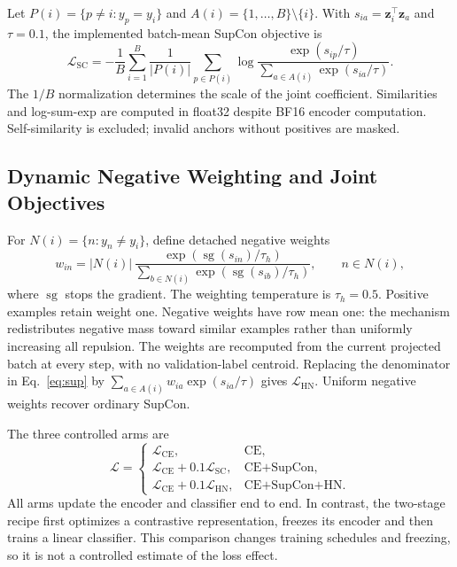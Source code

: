\documentclass[runningheads]{llncs}
\begin{document}
Let $P(i)=\{p\ne i:y_p=y_i\}$ and $A(i)=\{1,\ldots,B\}\setminus\{i\}$. With $s_{ia}=\mathbf z_i^\top\mathbf z_a$ and $\tau=0.1$, the implemented batch-mean SupCon objective is
\begin{equation}
\mathcal L_{\mathrm{SC}}=-\frac1B\sum_{i=1}^B\frac1{|P(i)|}
\sum_{p\in P(i)}\log\frac{\exp(s_{ip}/\tau)}{\sum_{a\in A(i)}\exp(s_{ia}/\tau)}.
\label{eq:sup}
\end{equation}
The $1/B$ normalization determines the scale of the joint coefficient. Similarities and log-sum-exp are computed in float32 despite BF16 encoder computation. Self-similarity is excluded; invalid anchors without positives are masked.

\subsection{Dynamic Negative Weighting and Joint Objectives}
For $N(i)=\{n:y_n\ne y_i\}$, define detached negative weights
\begin{equation}
w_{in}=|N(i)|\,
\frac{\exp(\operatorname{sg}(s_{in})/\tau_h)}
{\sum_{b\in N(i)}\exp(\operatorname{sg}(s_{ib})/\tau_h)},
\qquad n\in N(i),
\label{eq:weight}
\end{equation}
where $\operatorname{sg}$ stops the gradient. The weighting temperature is $\tau_h=0.5$. Positive examples retain weight one. Negative weights have row mean one: the mechanism redistributes negative mass toward similar examples rather than uniformly increasing all repulsion. The weights are recomputed from the current projected batch at every step, with no validation-label centroid. Replacing the denominator in Eq.~\ref{eq:sup} by $\sum_{a\in A(i)}w_{ia}\exp(s_{ia}/\tau)$ gives $\mathcal L_{\mathrm{HN}}$. Uniform negative weights recover ordinary SupCon.

The three controlled arms are
\begin{equation}
\mathcal L=\begin{cases}
\mathcal L_{\mathrm{CE}},&\text{CE},\\
\mathcal L_{\mathrm{CE}}+0.1\mathcal L_{\mathrm{SC}},&\text{CE+SupCon},\\
\mathcal L_{\mathrm{CE}}+0.1\mathcal L_{\mathrm{HN}},&\text{CE+SupCon+HN}.
\end{cases}
\end{equation}
All arms update the encoder and classifier end to end. In contrast, the two-stage recipe first optimizes a contrastive representation, freezes its encoder and then trains a linear classifier. This comparison changes training schedules and freezing, so it is not a controlled estimate of the loss effect.
\end{document}
